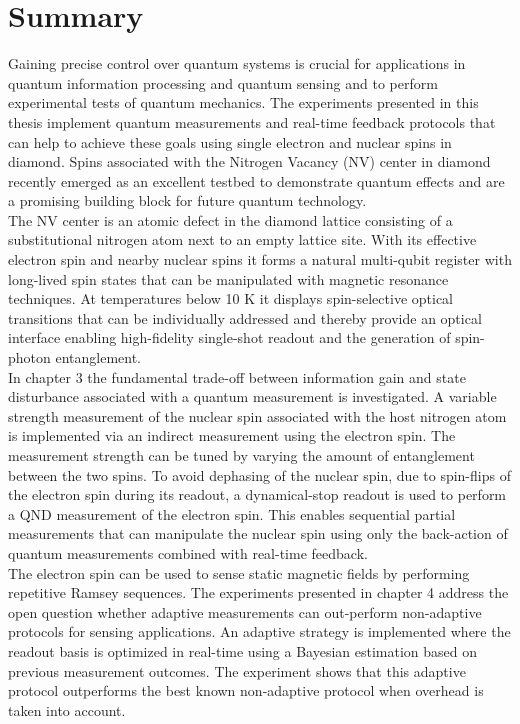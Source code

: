 \chapter{Summary}

Gaining precise control over quantum systems is crucial for applications in quantum information processing and quantum sensing and to perform experimental tests of quantum mechanics. The experiments presented in this thesis implement quantum measurements and real-time feedback protocols that can help to achieve these goals using single electron and nuclear spins in diamond. Spins associated with the Nitrogen Vacancy (NV) center in diamond recently emerged as an excellent testbed to demonstrate quantum effects and are a promising building block for future quantum technology.\\

The NV center is an atomic defect in the diamond lattice consisting of a substitutional nitrogen atom next to an empty lattice site. With its effective electron spin and nearby nuclear spins it forms a natural multi-qubit register with long-lived spin states that can be manipulated with magnetic resonance techniques. At temperatures below 10 K it displays spin-selective optical transitions that can be individually addressed and thereby provide an optical interface enabling high-fidelity single-shot readout and the generation of spin-photon entanglement.\\

In chapter 3 the fundamental trade-off between information gain and state disturbance associated with a quantum measurement is investigated. A variable strength measurement of the nuclear spin associated with the host nitrogen atom is implemented via an indirect measurement using the electron spin. The measurement strength can be tuned by varying the amount of entanglement between the two spins. To avoid dephasing of the nuclear spin, due to spin-flips of the electron spin during its readout, a dynamical-stop readout is used to perform a QND measurement of the electron spin. This enables sequential partial measurements that can manipulate the nuclear spin using only the back-action of quantum measurements combined with real-time feedback. \\

The electron spin can be used to sense static magnetic fields by performing repetitive Ramsey sequences. The experiments presented in chapter 4 address the open question whether adaptive measurements can out-perform non-adaptive protocols for sensing applications. An adaptive strategy is implemented where the readout basis is optimized in real-time using a Bayesian estimation based on previous measurement outcomes. The experiment shows that this adaptive protocol outperforms the best known non-adaptive protocol when overhead is taken into account.\\

